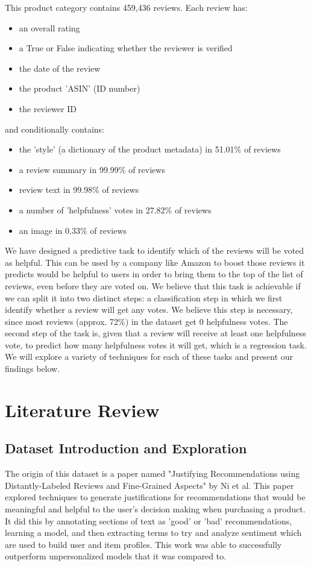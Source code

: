 \documentclass[final]{cvpr}
\begin{document}
This product category contains 459,436 reviews. Each review has:
\begin{itemize}
\item an overall rating
\item a True or False indicating whether the reviewer is verified
\item the date of the review
\item the product 'ASIN' (ID number)
\item the reviewer ID
\end{itemize}
and conditionally contains:
\begin{itemize}
\item the 'style' (a dictionary of the product metadata) in 51.01\% of reviews
\item a review summary in 99.99\% of reviews
\item review text in 99.98\% of reviews
\item a number of 'helpfulness' votes in 27.82\% of reviews
\item an image in 0.33\% of reviews
\end{itemize}

We have designed a predictive task to identify which of the reviews will be voted as helpful. This can be used by a company like Amazon to boost those reviews it predicts would be helpful to users in order to bring them to the top of the list of reviews, even before they are voted on. We believe that this task is achievable if we can split it into two distinct steps: a classification step in which we first identify whether a review will get any votes. We believe this step is necessary, since most reviews (approx. 72\%) in the dataset get 0 helpfulness votes. The second step of the task is, given that a review will receive at least one helpfulness vote, to predict how many helpfulness votes it will get, which is a regression task. We will explore a variety of techniques for each of these tasks and present our findings below.

\section{Literature Review}
\subsection{Dataset Introduction and Exploration}
The origin of this dataset is a paper named "Justifying Recommendations using Distantly-Labeled Reviews and Fine-Grained Aspects" by Ni et al. This paper explored techniques to generate justifications for recommendations that would be meaningful and helpful to the user's decision making when purchasing a product. It did this by annotating sections of text as 'good' or 'bad' recommendations, learning a model, and then extracting terms to try and analyze sentiment which are used to build user and item profiles. This work was able to successfully outperform unpersonalized models that it was compared to\cite{amazon}.
\end{document}
